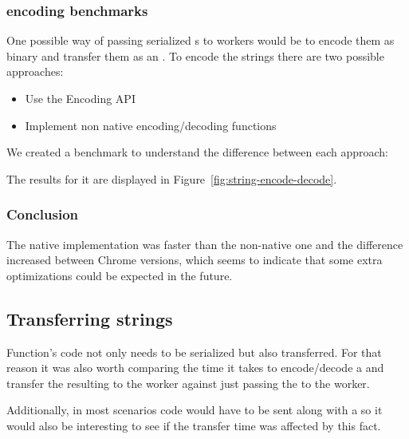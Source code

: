 
\subsubsection{\tstring{} encoding benchmarks}
One possible way of passing serialized \tfunction{}s to workers would be to encode them as binary and transfer them as an \tabuffer{}. To encode the strings there are two possible approaches:
\begin{itemize}
  \item Use the Encoding API\cite{encoding-api}
  \item Implement non native encoding/decoding functions
\end{itemize}

We created a benchmark to understand the difference between each approach:

The results for it are displayed in Figure~\ref{fig:string-encode-decode}.

\subsubsection{Conclusion}
The native implementation was faster than the non-native one and the difference increased between Chrome versions, which seems to indicate that some extra optimizations could be expected in the future.

\subsection{Transferring strings}
Function's code not only needs to be serialized but also transferred. For that reason it was also worth comparing the time it takes to encode/decode a \tstring{} and transfer the resulting \tabuffer{} to the worker against just passing the \tstring{} to the worker.

Additionally, in most scenarios code would have to be sent along with a \ttarray{} so it would also be interesting to see if the transfer time was affected by this fact.

